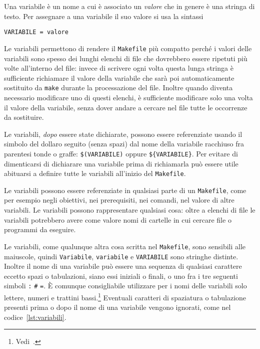 Una variabile è un nome a cui è associato un \emph{valore} che in genere è una
stringa di testo.  Per assegnare a una variabile il suo valore si usa la
sintassi
\begin{lstlisting}
VARIABILE = valore
\end{lstlisting}
Le variabili permettono di rendere il \texttt{Makefile} più compatto perché i
valori delle variabili sono spesso dei lunghi elenchi di file che dovrebbero
essere ripetuti più volte all'interno del file: invece di scrivere ogni volta
questa lunga stringa è sufficiente richiamare il valore della variabile che sarà
poi automaticamente sostituito da \texttt{make} durante la processazione del
file.  Inoltre quando diventa necessario modificare uno di questi elenchi, è
sufficiente modificare solo una volta il valore della variabile, senza dover
andare a cercare nel file tutte le occorrenze da sostituire.

Le variabili, \emph{dopo} essere state dichiarate, possono essere referenziate
usando il simbolo del dollaro seguito (senza spazi) dal nome della variabile
racchiuso fra parentesi tonde o graffe: \texttt{\$(VARIABILE)} oppure
\texttt{\$\{VARIABILE\}}.  Per evitare di dimenticarsi di dichiarare una
variabile prima di richiamarla può essere utile abituarsi a definire tutte le
variabili all'inizio del \texttt{Makefile}.

Le variabili possono essere referenziate in qualsiasi parte di un
\texttt{Makefile}, come per esempio negli obiettivi, nei prerequisiti, nei
comandi, nel valore di altre variabili.  Le variabili possono rappresentare
qualsiasi cosa: oltre a elenchi di file le variabili potrebbero avere come
valore nomi di cartelle in cui cercare file o programmi da eseguire.

Le variabili, come qualunque altra cosa scritta nel \texttt{Makefile}, sono
sensibili alle maiuscole, quindi \texttt{Variabile}, \texttt{variabile} e
\texttt{VARIABILE} sono stringhe distinte.  Inoltre il nome di una variabile può
essere una sequenza di qualsiasi carattere eccetto spazi o tabulazioni, siano
essi iniziali o finali, o uno fra i tre seguenti simboli \texttt{:} \texttt{\#}
\texttt{=}.  È comunque consigliabile utilizzare per i nomi delle variabili solo
lettere, numeri e trattini bassi.\footnote{Vedi~\textcite[57]{gnu:make}.}
Eventuali caratteri di spaziatura o tabulazione presenti prima o dopo il nome di
una variabile vengono ignorati, come nel codice~\ref{lst:variabili}.

